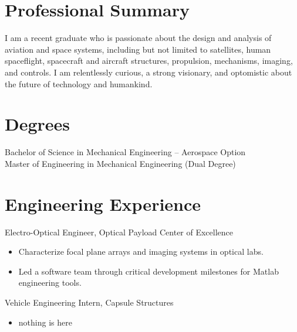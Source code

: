 \documentclass[10pt,final,sans]{resume}
\begin{document}
\setlength\headheight{28pt} %

\section{Professional Summary}
I am a recent graduate who is passionate about the design and analysis of
aviation and space systems, including but not limited to satellites, human
spaceflight, spacecraft and aircraft structures, propulsion, mechanisms,
imaging, and controls. I am relentlessly curious, a strong visionary, and
optomistic about the future of technology and humankind.

\section{Degrees}
Bachelor of Science in Mechanical Engineering -- Aerospace Option \\
Master of Engineering in Mechanical Engineering (Dual Degree) 

\section{Engineering Experience}
Electro-Optical Engineer, Optical Payload Center of Excellence
\begin{itemize}
  \item Characterize focal plane arrays and imaging systems in optical labs.
  \item Led a software team through critical development milestones for Matlab engineering tools. 
\end{itemize} 
Vehicle Engineering Intern, Capsule Structures
\begin{itemize}
  \item nothing is here
\end{itemize}
\end{document}
